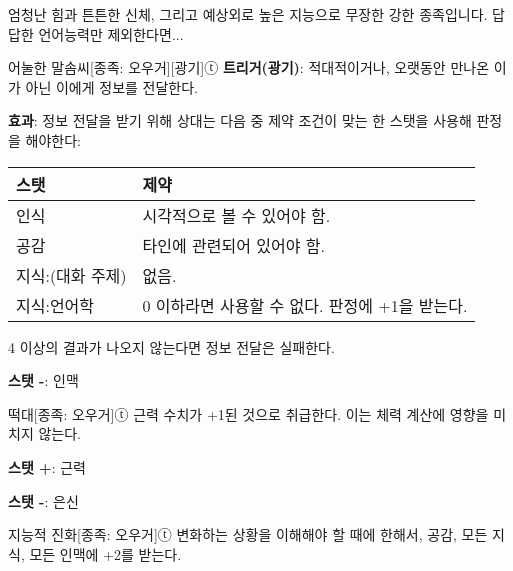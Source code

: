 \documentclass{report}
\begin{document}
	엄청난 힘과 튼튼한 신체, 그리고 예상외로 높은 지능으로 무장한 강한 종족입니다. 답답한 언어능력만 제외한다면...
	
	\begin{story}{어눌한 말솜씨}{[종족: 오우거][광기]ⓣ}
		\textbf{트리거(광기)}: 적대적이거나, 오랫동안 만나온 이가 아닌 이에게 정보를 전달한다.
		
		\textbf{효과}: 정보 전달을 받기 위해 상대는 다음 중 제약 조건이 맞는 한 스탯을 사용해 판정을 해야한다:
		
		\begin{center}
			\begin{tabular}{l|l}
				\textbf{스탯}    & \textbf{제약}                                  \\\hline\hline
				인식             & 시각적으로 볼 수 있어야 함.                    \\\hline
				공감             & 타인에 관련되어 있어야 함.                     \\\hline
				지식:(대화 주제) & 없음.                                          \\\hline
				지식:언어학      & 0 이하라면 사용할 수 없다. 판정에 +1을 받는다.
			\end{tabular}
		\end{center}
		
		4 이상의 결과가 나오지 않는다면 정보 전달은 실패한다.
		
		\textbf{스탯 -}: 인맥
		
	\end{story}
	
	\begin{story}{떡대}{[종족: 오우거]ⓣ}
		근력 수치가 +1된 것으로 취급한다. 이는 체력 계산에 영향을 미치지 않는다.
		
		\textbf{스탯 +}: 근력
		
		\textbf{스탯 -}: 은신
		
	\end{story}
	
	\begin{story}{지능적 진화}{[종족: 오우거]ⓣ}
		변화하는 상황을 이해해야 할 때에 한해서, 공감, 모든 지식, 모든 인맥에 +2를 받는다.
		
	\end{story}
\end{document}
